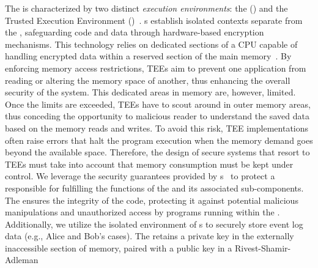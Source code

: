 The  is characterized by two distinct \textit{execution environments}: the  () and the Trusted Execution Environment ()~\cite{DBLP:conf/trustcom/SabtAB15}. s establish isolated contexts separate from the , safeguarding code and data through hardware-based encryption mechanisms. This technology relies on %
dedicated sections of a CPU capable of handling encrypted data within a reserved section of the main memory~\cite{costan2016intel}.
By enforcing memory access restrictions, TEEs aim to prevent one application from reading or altering the memory space of another, thus enhancing the overall security of the system.
This dedicated areas in memory are, however, limited.
Once the limits are exceeded, TEEs have to scout around in outer memory areas, thus conceding the opportunity to malicious reader to understand the saved data based on the memory reads and writes.
To avoid this risk, TEE implementations often raise errors that halt the program execution when the memory demand goes beyond the available space. %
Therefore, the design of secure systems that resort to TEEs must take into account that memory consumption must be kept under control.
We leverage the security guarantees provided by s~\cite{DBLP:journals/ieeesp/JauernigSS20} to protect a  responsible for fulfilling the functions of the  and its associated sub-components. %
The  ensures the integrity of the  code, protecting it against potential malicious manipulations and unauthorized access by programs running within the . Additionally, we utilize the isolated environment of s to securely store event log data (e.g., Alice and Bob's cases). %
The  retains a private key in the externally inaccessible section of memory, paired with a public key in a Rivest-Shamir-Adleman
